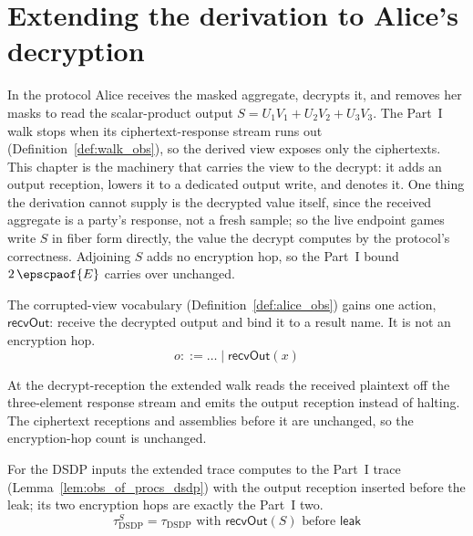 \chapter{Extending the derivation to Alice's decryption}
\label{ch:deriving_output}

In the protocol Alice receives the masked aggregate, decrypts it, and removes her
masks to read the scalar-product output $S=U_1V_1+U_2V_2+U_3V_3$. The Part~I walk
stops when its ciphertext-response stream runs out
(Definition~\ref{def:walk_obs}), so the derived view exposes only the ciphertexts.
This chapter is the machinery that carries the view to the decrypt: it adds an
output reception, lowers it to a dedicated output write, and denotes it. One thing
the derivation cannot supply is the decrypted value itself, since the received
aggregate is a party's response, not a fresh sample; so the live endpoint games
write $S$ in fiber form directly, the value the decrypt computes by the protocol's
correctness. Adjoining $S$ adds no encryption hop, so the Part~I bound
$2\,\epscpaof{E}$ carries over unchanged.

\begin{definition}
  \label{def:alice_obs_output}
  \rocqok
  The corrupted-view vocabulary (Definition~\ref{def:alice_obs}) gains one
  action, $\mathsf{recvOut}$: receive the decrypted output and bind it to a
  result name. It is not an encryption hop.
  \[ o \mathrel{::=} \dots \mid \mathsf{recvOut}(x) \]
\end{definition}

\begin{definition}
  \label{def:walk_obs_output}
  \rocqok
  At the decrypt-reception the extended walk reads the received plaintext off the
  three-element response stream and emits the output reception instead of
  halting. The ciphertext receptions and assemblies before it are unchanged, so
  the encryption-hop count is unchanged.
\end{definition}

\begin{lemma}
  \label{lem:obs_of_procs_dsdp_leak_S}
  \rocqok
  For the DSDP inputs the extended trace computes to the Part~I trace
  (Lemma~\ref{lem:obs_of_procs_dsdp}) with the output reception inserted before
  the leak; its two encryption hops are exactly the Part~I two.
  \[ \tau^{S}_{\mathrm{DSDP}}
        = \tau_{\mathrm{DSDP}} \text{ with } \mathsf{recvOut}(S)
        \text{ before } \mathsf{leak} \]
\end{lemma}

